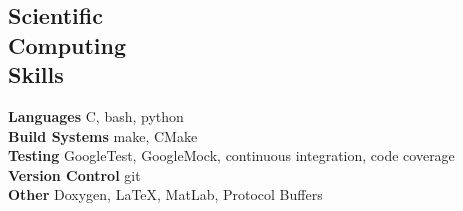 \documentclass[margin,line]{resume}
\newcommand{\Cpp}[1][]{\textrm{C\nolinebreak[4]\hspace{-.05em}\raisebox{.4ex}{\tiny\bfseries++}#1}}
\begin{document}
\begin{resume}
    \section{\mysidestyle Scientific\\Computing\\Skills}
                \textbf{Languages} \hfill  \Cpp{}, bash, python\vspace{.5mm}\\%
                \textbf{Build Systems} \hfill make, CMake \vspace{.5mm}\\%
                \textbf{Testing} \hfill GoogleTest, GoogleMock, continuous integration, code coverage\vspace{.5mm}\\%
                \textbf{Version Control} \hfill git\vspace{.5mm}\\%
                \textbf{Other} \hfill Doxygen, \LaTeX, MatLab, Protocol Buffers \vspace{.5mm}%





\end{resume}
\end{document}
